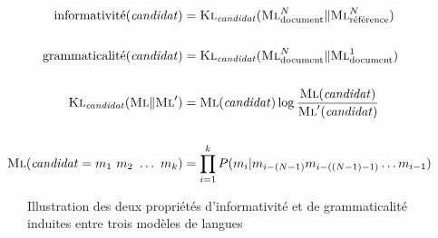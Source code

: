         \begin{align}
          \text{informativité}(\text{\textit{candidat}}) &= \textsc{Kl}_{\text{\textit{candidat}}}(\textsc{Ml}_{\text{document}}^{N} \| \textsc{Ml}_{\text{référence}}^{N}) \label{math:informativeness}\\
          \notag\\
          \text{grammaticalité}(\text{\textit{candidat}}) &= \textsc{Kl}_{\text{\textit{candidat}}}(\textsc{Ml}_{\text{document}}^{N} \| \textsc{Ml}_{\text{document}}^{1}) \label{math:phraseness}\\
          \notag\\
          \textsc{Kl}_{\text{\textit{candidat}}}(\textsc{Ml} \| \textsc{Ml}') &= \textsc{Ml}(\text{\textit{candidat}}) \log \frac{\textsc{Ml}(\text{\textit{candidat}})}{\textsc{Ml}'(\text{\textit{candidat}})} \label{math:kullbackleibler}\\
          \notag\\
          \textsc{Ml}(\text{\textit{candidat}} = m_1\ m_2\ \dots\ m_k) &= \prod_{i = 1}^k P(m_i | m_{i - (N - 1)} m_{i - ((N - 1) - 1)} \dots m_{i - 1}) \notag
        \end{align}
        \begin{figure}
          \centering


          \caption{Illustration des deux propriétés d'informativité et de
                   grammaticalité induites entre trois modèles de
                   langues~\cite{tomokiyo2003languagemodel}
                   \label{fig:klml}}
        \end{figure}

